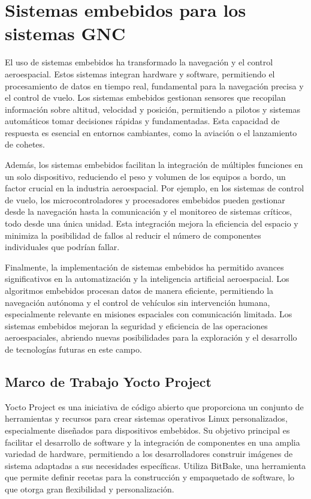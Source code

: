 \section{Sistemas embebidos para los sistemas GNC}

El uso de sistemas embebidos ha transformado la navegación y el control aeroespacial. Estos sistemas integran hardware y software, permitiendo el procesamiento de datos en tiempo real, fundamental para la navegación precisa y el control de vuelo. Los sistemas embebidos gestionan sensores que recopilan información sobre altitud, velocidad y posición, permitiendo a pilotos y sistemas automáticos tomar decisiones rápidas y fundamentadas. Esta capacidad de respuesta es esencial en entornos cambiantes, como la aviación o el lanzamiento de cohetes. \cite{Castao2014EstimacinDP}

Además, los sistemas embebidos facilitan la integración de múltiples funciones en un solo dispositivo, reduciendo el peso y volumen de los equipos a bordo, un factor crucial en la industria aeroespacial. Por ejemplo, en los sistemas de control de vuelo, los microcontroladores y procesadores embebidos pueden gestionar desde la navegación hasta la comunicación y el monitoreo de sistemas críticos, todo desde una única unidad. Esta integración mejora la eficiencia del espacio y minimiza la posibilidad de fallos al reducir el número de componentes individuales que podrían fallar. \cite{Culp1993GuidanceAC}

Finalmente, la implementación de sistemas embebidos ha permitido avances significativos en la automatización y la inteligencia artificial aeroespacial. Los algoritmos embebidos procesan datos de manera eficiente, permitiendo la navegación autónoma y el control de vehículos sin intervención humana, especialmente relevante en misiones espaciales con comunicación limitada. Los sistemas embebidos mejoran la seguridad y eficiencia de las operaciones  aeroespaciales, abriendo nuevas posibilidades para la exploración y el desarrollo de tecnologías futuras en este campo. \cite{Falcoz2023GuidanceN}

\subsection{Marco de Trabajo Yocto Project}

Yocto Project es una iniciativa de código abierto que proporciona un conjunto de herramientas y recursos para crear sistemas operativos Linux personalizados, especialmente diseñados para dispositivos embebidos. Su objetivo principal es facilitar el desarrollo de software y la integración de componentes en una amplia variedad de hardware, permitiendo a los desarrolladores construir imágenes de sistema adaptadas a sus necesidades específicas. Utiliza BitBake, una herramienta que permite definir recetas para la construcción y empaquetado de software, lo que otorga gran flexibilidad y personalización. \cite{salvador2014embedded}

